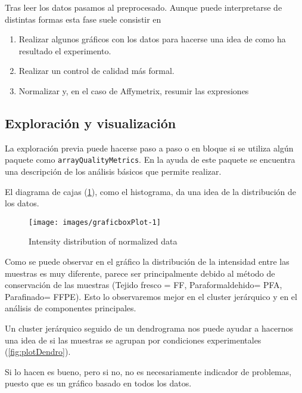 \documentclass[a4paper]{article}\usepackage[]{graphicx}\usepackage[]{color}
\makeatletter
\def\maxwidth{ %
  \ifdim\Gin@nat@width>\linewidth
    \linewidth
  \else
    \Gin@nat@width
  \fi
}
\newenvironment{knitrout}{}{} %
\newcommand{\Rpackage}[1]{{\texttt{#1}}}
\makeatother
\begin{document}
Tras leer los datos pasamos al preprocesado.
Aunque puede interpretarse de distintas formas esta fase suele consistir en 
\begin{enumerate}
\item Realizar algunos gráficos con los datos para hacerse una idea de como ha resultado el experimento.
\item Realizar un control de calidad más formal.
\item Normalizar y, en el caso de Affymetrix, resumir las expresiones
\end{enumerate}

\subsection{Exploración y visualización}

La exploración previa puede hacerse paso a paso o en bloque si se utiliza algún paquete como
\Rpackage{arrayQualityMetrics}. En la ayuda de este paquete se encuentra una descripción de los análisis básicos que permite realizar.

El diagrama de cajas (\ref{fig:boxPlot}), como el histograma, da una idea de la distribución de los datos.

\begin{knitrout}
\color{fgcolor}\begin{figure}
\texttt{[image: images/graficboxPlot-1]} \caption[Intensity distribution of normalized data]{Intensity distribution of normalized data}\label{fig:boxPlot}
\end{figure}


\end{knitrout}
\noindent Como se puede observar en el gráfico la distribución de la intensidad entre las muestras es muy diferente, parece ser principalmente debido al método de conservación de las muestras (Tejido fresco = FF, Paraformaldehido= PFA, Parafinado= FFPE). Esto lo observaremos mejor en el cluster jerárquico y en el análisis de componentes principales.





Un cluster jerárquico seguido de un dendrograma nos puede ayudar a hacernos una idea
de si las muestras se agrupan por condiciones experimentales (\ref{fig:plotDendro}). 

Si lo hacen es bueno, pero si no, no es necesariamente indicador de problemas, 
puesto que es un gráfico basado en todos los datos.
\end{document}
